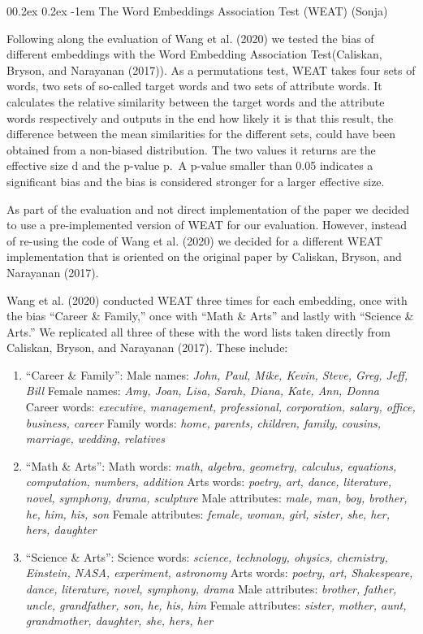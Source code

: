 \documentclass[
  english,
  man,floatsintext]{apa6}
\makeatletter
\let\oldparagraph\paragraph
\renewcommand{\paragraph}[1]{\oldparagraph{#1}\mbox{}}
\renewcommand{\paragraph}{\@startsection{paragraph}{4}{\parindent}%
  {0\baselineskip \@plus 0.2ex \@minus 0.2ex}%
  {-1em}%
  {\normalfont\normalsize\bfseries\itshape\typesectitle}}
\makeatother
\begin{document}
\hypertarget{the-word-embeddings-association-test-weat-sonja}{%
\paragraph{The Word Embeddings Association Test (WEAT) (Sonja)}\label{the-word-embeddings-association-test-weat-sonja}}

Following along the evaluation of Wang et al. (2020) we tested the bias of different embeddings with the Word Embedding Association Test(Caliskan, Bryson, and Narayanan (2017)). As a permutations test, WEAT takes four sets of words, two sets of so-called target words and two sets of attribute words. It calculates the relative similarity between the target words and the attribute words respectively and outputs in the end how likely it is that this result, the difference between the mean similarities for the different sets, could have been obtained from a non-biased distribution. The two values it returns are the effective size d and the p-value p.~A p-value smaller than 0.05 indicates a significant bias and the bias is considered stronger for a larger effective size.

As part of the evaluation and not direct implementation of the paper we decided to use a pre-implemented version of WEAT for our evaluation. However, instead of re-using the code of Wang et al. (2020) we decided for a different WEAT implementation that is oriented on the original paper by Caliskan, Bryson, and Narayanan (2017).

Wang et al. (2020) conducted WEAT three times for each embedding, once with the bias ``Career \& Family,'' once with ``Math \& Arts'' and lastly with ``Science \& Arts.'' We replicated all three of these with the word lists taken directly from Caliskan, Bryson, and Narayanan (2017). These include:

\begin{enumerate}
\def\labelenumi{\arabic{enumi}.}
\item
  ``Career \& Family'':
  Male names: \emph{John, Paul, Mike, Kevin, Steve, Greg, Jeff, Bill}
  Female names: \emph{Amy, Joan, Lisa, Sarah, Diana, Kate, Ann, Donna}
  Career words: \emph{executive, management, professional, corporation, salary, office, business, career}
  Family words: \emph{home, parents, children, family, cousins, marriage, wedding, relatives}
\item
  ``Math \& Arts'':
  Math words: \emph{math, algebra, geometry, calculus, equations, computation, numbers, addition}
  Arts words: \emph{poetry, art, dance, literature, novel, symphony, drama, sculpture}
  Male attributes: \emph{male, man, boy, brother, he, him, his, son}
  Female attributes: \emph{female, woman, girl, sister, she, her, hers, daughter}
\item
  ``Science \& Arts'':
  Science words: \emph{science, technology, ohysics, chemistry, Einstein, NASA, experiment, astronomy}
  Arts words: \emph{poetry, art, Shakespeare, dance, literature, novel, symphony, drama}
  Male attributes: \emph{brother, father, uncle, grandfather, son, he, his, him}
  Female attributes: \emph{sister, mother, aunt, grandmother, daughter, she, hers, her}
\end{enumerate}
\end{document}
